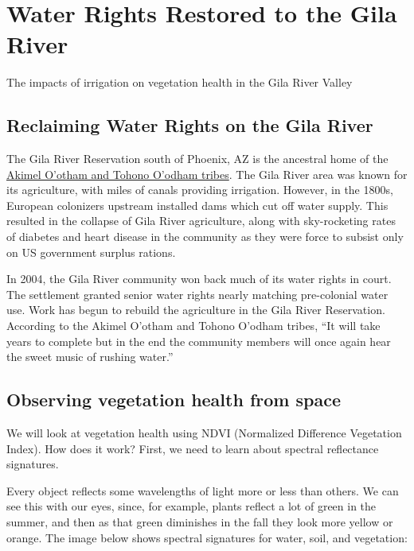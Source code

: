 \documentclass[
  letterpaper,
  DIV=11,
  numbers=noendperiod,
  oneside]{scrreprt}
\begin{document}

\chapter{Water Rights Restored to the Gila
River}\label{water-rights-restored-to-the-gila-river}

The impacts of irrigation on vegetation health in the Gila River Valley

\hfill\break

\section{Reclaiming Water Rights on the Gila
River}\label{reclaiming-water-rights-on-the-gila-river}

The Gila River Reservation south of Phoenix, AZ is the ancestral home of
the \href{https://www.gilariver.org/index.php}{Akimel O'otham and Tohono
O'odham tribes}. The Gila River area was known for its agriculture, with
miles of canals providing irrigation. However, in the 1800s, European
colonizers upstream installed dams which cut off water supply. This
resulted in the collapse of Gila River agriculture, along with
sky-rocketing rates of diabetes and heart disease in the community as
they were force to subsist only on US government surplus rations.

In 2004, the Gila River community won back much of its water rights in
court. The settlement granted senior water rights nearly matching
pre-colonial water use. Work has begun to rebuild the agriculture in the
Gila River Reservation. According to the Akimel O'otham and Tohono
O'odham tribes, ``It will take years to complete but in the end the
community members will once again hear the sweet music of rushing
water.''

\section{Observing vegetation health from
space}\label{observing-vegetation-health-from-space}

We will look at vegetation health using NDVI (Normalized Difference
Vegetation Index). How does it work? First, we need to learn about
spectral reflectance signatures.

Every object reflects some wavelengths of light more or less than
others. We can see this with our eyes, since, for example, plants
reflect a lot of green in the summer, and then as that green diminishes
in the fall they look more yellow or orange. The image below shows
spectral signatures for water, soil, and vegetation:
\end{document}
